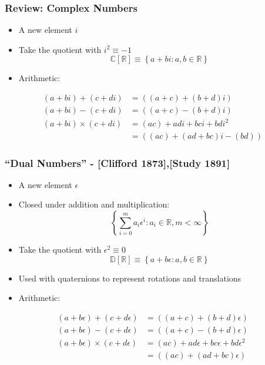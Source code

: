 \documentclass[mathserif]{beamer}
\newcommand{\Reals}{{\ensuremath{\mathbb{R}}}}
\newcommand{\Complex}{{\ensuremath{\mathbb{C}}}}
\newcommand{\Duals}{{\ensuremath{\mathbb{D}}}}
\begin{document}
\begin{frame}
\frametitle{Review: Complex Numbers}

\begin{itemize}
\item A new element $i$

\item Take the quotient with $i^2 \equiv -1$
\[\Complex[\Reals] \equiv \left\{a + b i: a,b \in \Reals\right\}\]
\item Arithmetic:
\end{itemize}
\begin{align*}
(a+b i) + (c+d i) &= ((a+c) + (b+d) i) \\
(a+b i) - (c+d i) &= ((a+c) - (b+d) i) \\
(a+b i) \times (c+d i) &= (ac) + ad i + bc i + bd i^2 \\
                              &= ((ac) + (ad+bc)i - (bd))
\end{align*}
\end{frame}


\begin{frame}
\frametitle{``Dual Numbers'' - [Clifford 1873],[Study 1891]} 

\begin{itemize}
\item A new element $\epsilon$
\item Closed under addition and multiplication:
\[\left\{\sum_{i=0}^{m} a_i \epsilon^i: a_i \in \Reals, m < \infty\right\}\]
\item Take the quotient with $\epsilon^2 \equiv 0$
\[\Duals[\Reals] \equiv \left\{a + b \epsilon: a,b \in \Reals\right\}\]
\item Used with quaternions to represent rotations and translations
\item Arithmetic:
\end{itemize}
\begin{align*}
(a+b\epsilon) + (c+d\epsilon) &= ((a+c) + (b+d)\epsilon) \\
(a+b\epsilon) - (c+d\epsilon) &= ((a+c) - (b+d)\epsilon) \\
(a+b\epsilon) \times (c+d\epsilon) &= (ac) + ad\epsilon + bc\epsilon + bd\epsilon^2 \\
                              &= ((ac) + (ad+bc)\epsilon)
\end{align*}
\end{frame}
\end{document}
